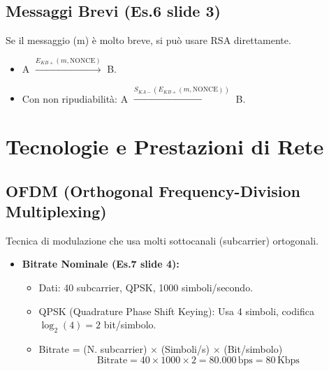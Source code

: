 \documentclass{article}
\begin{document}
\subsection{Messaggi Brevi (Es.6 slide 3)}
Se il messaggio (m) è molto breve, si può usare RSA direttamente.
\begin{itemize}
    \item A $\xrightarrow{E_{KB+}(m, \text{NONCE})}$ B.
    \item Con non ripudiabilità: A $\xrightarrow{S_{KA-}(E_{KB+}(m, \text{NONCE}))}$ B.
\end{itemize}

\section{Tecnologie e Prestazioni di Rete}

\subsection{OFDM (Orthogonal Frequency-Division Multiplexing)}
Tecnica di modulazione che usa molti sottocanali (subcarrier) ortogonali.
\begin{itemize}
    \item \textbf{Bitrate Nominale (Es.7 slide 4):}
    \begin{itemize}
        \item Dati: 40 subcarrier, QPSK, 1000 simboli/secondo.
        \item QPSK (Quadrature Phase Shift Keying): Usa 4 simboli, codifica $\log_2(4) = 2$ bit/simbolo.
        \item Bitrate = (N. subcarrier) $\times$ (Simboli/s) $\times$ (Bit/simbolo)
        \[ \text{Bitrate} = 40 \times 1000 \times 2 = 80.000 \, \text{bps} = 80 \, \text{Kbps} \]
    \end{itemize}
\end{itemize}
\end{document}
